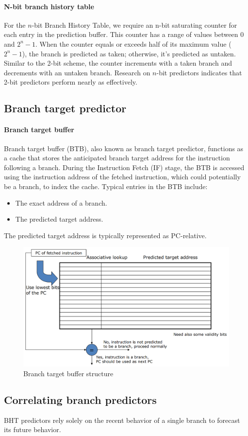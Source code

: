 \paragraph*{N-bit branch history table}
For the $n$-bit Branch History Table, we require an n-bit saturating counter for each entry in the prediction buffer.
This counter has a range of values between $0$ and $2^n - 1$.
When the counter equals or exceeds half of its maximum value ($2^n - 1$), the branch is predicted as taken; otherwise, it's predicted as untaken.
Similar to the 2-bit scheme, the counter increments with a taken branch and decrements with an untaken branch.
Research on $n$-bit predictors indicates that 2-bit predictors perform nearly as effectively.

\subsection{Branch target predictor}
\paragraph*{Branch target buffer}
Branch target buffer (BTB), also known as branch target predictor, functions as a cache that stores the anticipated branch target address for the instruction following a branch.
During the Instruction Fetch (IF) stage, the BTB is accessed using the instruction address of the fetched instruction, which could potentially be a branch, to index the cache.
Typical entries in the BTB include:
\begin{itemize}
    \item The exact address of a branch.
    \item The predicted target address.
\end{itemize}
The predicted target address is typically represented as PC-relative.
\begin{figure}[H]
    \centering
    \includegraphics[width=0.5\linewidth]{images/btb.png}
    \caption{Branch target buffer structure}
\end{figure}

\subsection{Correlating branch predictors}
BHT predictors rely solely on the recent behavior of a single branch to forecast its future behavior.

